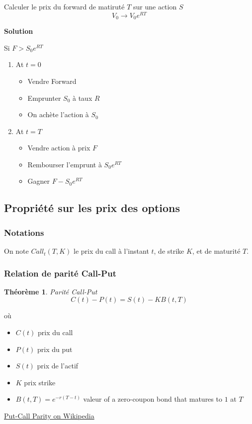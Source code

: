 \documentclass{article}
\theoremstyle{plain}
\newtheorem{thm}{Th\'eor\`eme}[section]
\theoremstyle{definition}
\begin{document}
Calculer le prix du forward de matirut\'e $T$ sur une action $S$
\begin{equation}
	V_0\rightarrow V_0e^{RT}
\end{equation}

\textbf{Solution}

Si $F>S_0e^{RT}$
\begin{enumerate}
	\item At $t=0$
	\begin{itemize}
		\item Vendre Forward
		\item Emprunter $S_0$ \`a taux $R$
		\item On ach\`ete l'action \`a $S_0$
	\end{itemize}
	\item At $t=T$
	\begin{itemize}
		\item Vendre action \`a prix $F$
		\item Rembourser l'emprunt \`a $S_0e^{RT}$
		\item Gagner $F-S_0e^{RT}$
	\end{itemize}
\end{enumerate}

\subsection{Propri\'et\'e sur les prix des options}

\subsubsection{Notations}
On note $Call_t(T,K)$ le prix du call \`a l'instant $t$, de strike $K$, et de maturit\'e $T$.

\subsubsection{Relation de parit\'e Call-Put}

\begin{thm}
	Parit\'e Call-Put
	\begin{equation}
		C(t) - P(t) = S(t)-KB(t,T)
	\end{equation}
\end{thm}
o\`u
\begin{itemize}
	\item $C(t)$ prix du call
	\item $P(t)$ prix du put
	\item $S(t)$ prix de l'actif
	\item $K$ prix strike
	\item $B(t,T)=e^{-r(T-t)}$ valeur of a zero-coupon bond that matures to $1$ at  $T$
\end{itemize}
{\color{blue} \href{https://en.wikipedia.org/wiki/Put%E2%80%93call_parity}{Put-Call Parity on Wikipedia}}
\end{document}
